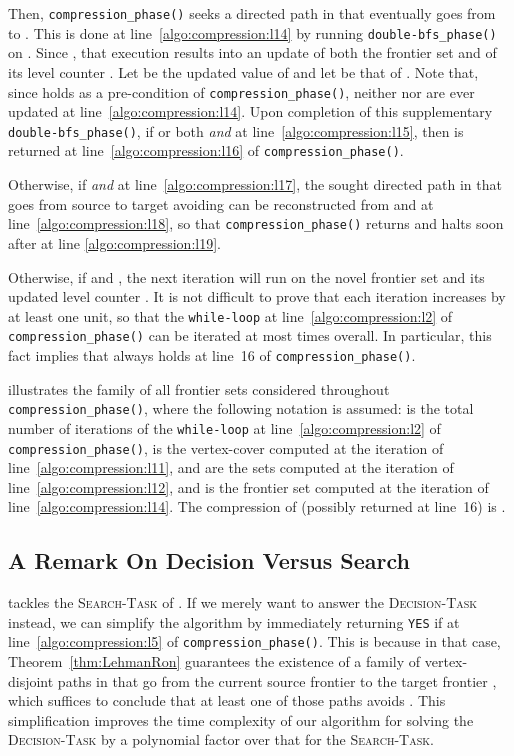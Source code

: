 \begin{enumerate}
Then, \texttt{compression\_phase()}
seeks a directed
path in  that eventually goes from  to .
This is done at line~\ref{algo:compression:l14} by running
\texttt{double-bfs\_phase()}
on .
Since , that execution results into an update of
both the frontier set  and of its level counter .
Let  be the updated value of  and let  be that of .
Note that, since  holds as a pre-condition of \texttt{compression\_phase()},
neither  nor  are ever updated at line~\ref{algo:compression:l14}.
Upon completion of this supplementary \texttt{double-bfs\_phase()},
if  or both
 \emph{and}
 at line~\ref{algo:compression:l15},
then 
is returned at line~\ref{algo:compression:l16} of \texttt{compression\_phase()}.

Otherwise, if  \emph{and}  at line~\ref{algo:compression:l17},
the sought directed path  in  that goes from source  to target  avoiding 
can be reconstructed from  and  at line~\ref{algo:compression:l18},
so that \texttt{compression\_phase()} returns 
and halts soon after at line \ref{algo:compression:l19}.

Otherwise, if  and ,
the next iteration will run on the novel frontier set  and its updated level counter .
It is not difficult to prove that each iteration increases  by at least one unit,
so that the \texttt{while-loop} at line~\ref{algo:compression:l2} of \texttt{compression\_phase()}
can be iterated at most  times overall.
In particular, this fact implies that 
always holds at line~16 of \texttt{compression\_phase()}.
\end{enumerate}

 illustrates the family of all frontier sets considered throughout \texttt{com\-pres\-sion\_phase()},
where the following notation is assumed:
 is the total number of iterations of the \texttt{while-loop}
at line~\ref{algo:compression:l2} of \texttt{compression\_phase()},
 is the vertex-cover computed at the  iteration of line~\ref{algo:compression:l11},
 and  are the sets computed at the  iteration of line~\ref{algo:compression:l12}, and
 is the frontier set computed at the  iteration of line~\ref{algo:compression:l14}.
The compression of  (possibly returned at line~16)
is
.


\subsection{A Remark On Decision Versus Search}\label{sect:remark_dec_search}

tackles
the \textsc{Search-Task} of \mainproblem.
If
we merely want to answer the \textsc{Decision-Task} instead,
we can simplify the algorithm
by immediately returning \texttt{YES} if  at line~\ref{algo:compression:l5} of \texttt{compression\_phase()}.
This is because in that case,
Theorem~\ref{thm:LehmanRon} guarantees the existence of a family of
 vertex-disjoint paths in 
that go from the current source frontier  to the target frontier ,
which suffices to conclude that at least one of those paths avoids .
This simplification
improves the time complexity of our algorithm for solving the \textsc{Decision-Task} by a polynomial factor
over that for the \textsc{Search-Task}.

